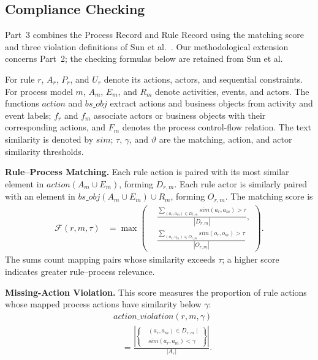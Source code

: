 \subsection{Compliance Checking}
\label{sec:3.3}

Part~3 combines the Process Record and Rule Record using the matching score and three violation definitions of Sun et al.~\cite{sun2024design}. Our methodological extension concerns Part~2; the checking formulas below are retained from Sun et al.

For rule \(r\), \(A_r\), \(P_r\), and \(U_r\) denote its actions, actors, and sequential constraints. For process model \(m\), \(A_m\), \(E_m\), and \(R_m\) denote activities, events, and actors. The functions \(action\) and \(\mathit{bs\_obj}\) extract actions and business objects from activity and event labels; \(f_r\) and \(f_m\) associate actors or business objects with their corresponding actions, and \(F_m\) denotes the process control-flow relation. The text similarity is denoted by \(sim\); \(\tau\), \(\gamma\), and \(\vartheta\) are the matching, action, and actor similarity thresholds.

\textbf{Rule--Process Matching.} Each rule action is paired with its most similar element in \(action(A_m\cup E_m)\), forming \(D_{r,m}\). Each rule actor is similarly paired with an element in \(\mathit{bs\_obj}(A_m\cup E_m)\cup R_m\), forming \(O_{r,m}\). The matching score is
\begin{equation}
\begin{aligned}
\mathcal{F}(r,m,\tau)
&=\max\left(
\begin{aligned}
&\frac{\displaystyle\sum_{(a_r,a_m)\in D_{r,m}}
sim(a_r,a_m)>\tau}{|D_{r,m}|},\\[2pt]
&\frac{\displaystyle\sum_{(o_r,o_m)\in O_{r,m}}
sim(o_r,o_m)>\tau}{|O_{r,m}|}
\end{aligned}
\right).
\end{aligned}
\label{eq:matching}
\end{equation}
The sums count mapping pairs whose similarity exceeds \(\tau\); a higher score indicates greater rule--process relevance.

\textbf{Missing-Action Violation.} This score measures the proportion of rule actions whose mapped process actions have similarity below \(\gamma\):
\begin{equation}
\begin{aligned}
&\mathit{action\_violation}(r,m,\gamma)\\
&\quad=\frac{\left|\left\{\begin{aligned}
&(a_r,a_m)\in D_{r,m}\mid\\
&sim(a_r,a_m)<\gamma
\end{aligned}\right\}\right|}{|A_r|}.
\end{aligned}
\label{eq:missing}
\end{equation}


